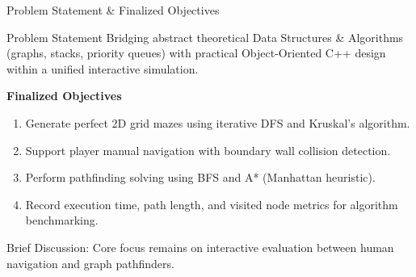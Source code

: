 \documentclass[aspectratio=169,11pt]{beamer}
\newcommand{\smallnote}[1]{%
\vspace{0.08cm}
{\scriptsize\color{GEUGrey}#1}
}
\begin{document}
\begin{frame}{Problem Statement \& Finalized Objectives}

\begin{block}{Problem Statement}
\small Bridging abstract theoretical Data Structures \& Algorithms (graphs, stacks, priority queues) with practical Object-Oriented C++ design within a unified interactive simulation.
\end{block}

\vspace{2mm}

\textbf{\color{GEUBlue}Finalized Objectives}

\begin{enumerate}\itemsep2pt
\item Generate perfect 2D grid mazes using iterative DFS and Kruskal's algorithm.
\item Support player manual navigation with boundary wall collision detection.
\item Perform pathfinding solving using BFS and A* (Manhattan heuristic).
\item Record execution time, path length, and visited node metrics for algorithm benchmarking.
\end{enumerate}

\vfill

\smallnote{
Brief Discussion: Core focus remains on interactive evaluation between human navigation and graph pathfinders.
}

\end{frame}
\end{document}
